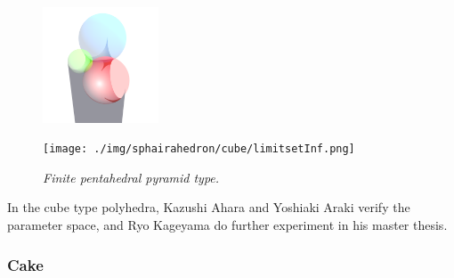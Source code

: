 \documentclass[dvipdfmx]{interact}
\theoremstyle{plain}%
\theoremstyle{definition}
\theoremstyle{remark}
\theoremstyle{problemstyle}
\begin{document}
\begin{figure}[H]
\begin{minipage}{0.5\textwidth}
\begin{minipage}[t]{0.24\textwidth}
   \centering
   \includegraphics[width=1.35in, height=1.35in,
   keepaspectratio]{./img/sphairahedron/cube/sphairahedronInf.png}
  \end{minipage}
  \hspace*{\fill}
  \begin{minipage}[t]{0.24\textwidth}
   \centering
   \texttt{[image: ./img/sphairahedron/cube/limitsetInf.png]} 
  \end{minipage}
  \hspace*{\fill}
  \caption{\textit{Finite pentahedral pyramid type.}}
  \label{fig:cubeInf}
 \end{minipage}
\end{figure}

In the cube type polyhedra, Kazushi Ahara and Yoshiaki Araki
verify the parameter space, and Ryo Kageyama do further experiment in
his master thesis\cite{kageyama}. 

\subsubsection{Cake}
\end{document}
